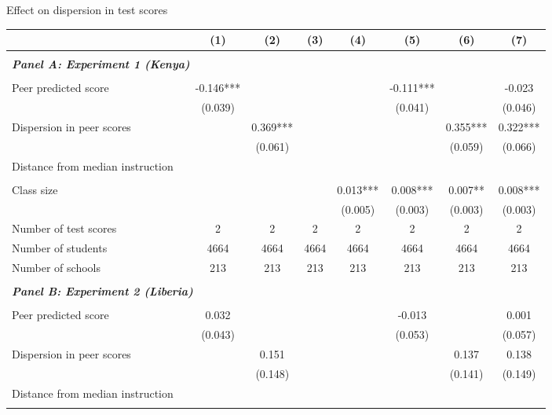 \begin{center} 
\caption{\small Effect on dispersion in test scores} 
\label{tab:descriptives} 
\begin{scriptsize}
\begin{threeparttable}
\begin{tabular} {@{} l l c c c c c c c  @{}} \toprule \toprule
& &(1)&(2)&(3)&(4)&(5)&(6)&(7) \\ \midrule 
\\
\multicolumn{3}{l}{\textbf{\textit{Panel A: Experiment 1 (Kenya)}}} \\
\\
Peer predicted score &  & -0.146*** &  &  &  & -0.111*** &  & -0.023 \\
                 &  & (0.039) &  &  &  & (0.041) &  & (0.046) \\
Dispersion in peer scores &  &  & 0.369*** &  &  &  & 0.355*** & 0.322*** \\
                 &  &  & (0.061) &  &  &  & (0.059) & (0.066) \\
Distance from median instruction &  &  &  &  &  &  &  &  \\
                 &  &  &  &  &  &  &  &  \\
Class size &  &  &  &  & 0.013*** & 0.008*** & 0.007** & 0.008*** \\
                 &  &  &  &  & (0.005) & (0.003) & (0.003) & (0.003) \\
\midrule
Number of test scores &  & 2 & 2 & 2 & 2 & 2 & 2 & 2 \\
Number of students &  & 4664 & 4664 & 4664 & 4664 & 4664 & 4664 & 4664 \\
Number of schools &  & 213 & 213 & 213 & 213 & 213 & 213 & 213 \\
 \midrule
\\
\multicolumn{3}{l}{\textbf{\textit{Panel B: Experiment 2 (Liberia)}}} \\
\\
Peer predicted score &  & 0.032 &  &  &  & -0.013 &  & 0.001 \\
                 &  & (0.043) &  &  &  & (0.053) &  & (0.057) \\
Dispersion in peer scores &  &  & 0.151 &  &  &  & 0.137 & 0.138 \\
                 &  &  & (0.148) &  &  &  & (0.141) & (0.149) \\
Distance from median instruction &  &  &  &  &  &  &  &  \\
                 &  &  &  &  &  &  &  &  \\

\end{tabular}
\end{threeparttable}
\end{scriptsize}
\end{center}
